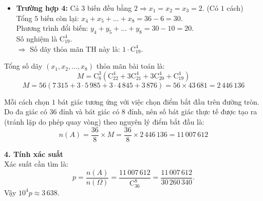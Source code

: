 \begin{ex}
{\begin{itemize}
			\item \textbf{Trường hợp 4:} Cả $3$ biến đều bằng $2 \Rightarrow x_1=x_2=x_3=2$. (Có $1$ cách)\\
			Tổng $5$ biến còn lại: $x_4 + x_5 + \dots + x_8 = 36 - 6 = 30$.\\
			Phương trình đổi biến: $y_4 + y_5 + \dots + y_8 = 30 - 10 = 20$.\\
			Số nghiệm là $\mathrm{C}_{19}^4$.\\
			$\Rightarrow$ Số dãy thỏa mãn TH này là: $1 \cdot \mathrm{C}_{19}^4$.
		\end{itemize}
		
		Tổng số dãy $(x_1, x_2, \dots, x_8)$ thỏa mãn bài toán là:
		$$M = \mathrm{C}_8^3 \left( \mathrm{C}_{22}^4 + 3\mathrm{C}_{21}^4 + 3\mathrm{C}_{20}^4 + \mathrm{C}_{19}^4 \right)$$
		$$M = 56 \left( 7\,315 + 3 \cdot 5\,985 + 3 \cdot 4\,845 + 3\,876 \right) = 56 \times 43\,681 = 2\,446\,136$$
		
		Mỗi cách chọn $1$ bát giác tương ứng với việc chọn điểm bắt đầu trên đường tròn. Do đa giác có $36$ đỉnh và bát giác có $8$ đỉnh, nên số bát giác thực tế được tạo ra (tránh lặp do phép quay vòng) theo nguyên lý điểm bắt đầu là:
		$$n(A) = \dfrac{36}{8} \times M = \dfrac{36}{8} \times 2\,446\,136 = 11\,007\,612$$
		
		\textbf{4. Tính xác suất}\\
		Xác suất cần tìm là:
		$$p = \dfrac{n(A)}{n(\Omega)} = \dfrac{11\,007\,612}{\mathrm{C}_{36}^8} = \dfrac{11\,007\,612}{30\,260\,340}.$$
		Vậy $10^4 p \approx 3\,638$.
	}
\end{ex}
